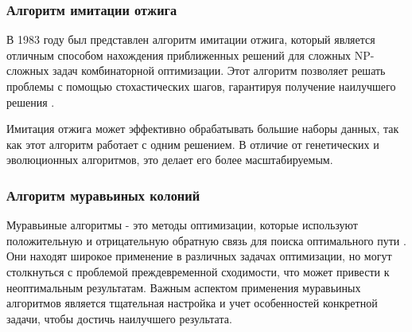 \subsubsection{Алгоритм имитации отжига}

В 1983 году был представлен алгоритм имитации отжига, который является отличным способом нахождения приближенных решений для сложных NP-сложных задач комбинаторной оптимизации. Этот алгоритм позволяет решать проблемы с помощью стохастических шагов, гарантируя получение наилучшего решения \cite{Kalashnikov_2004}.

Имитация отжига может эффективно обрабатывать большие наборы данных, так как этот алгоритм работает с одним решением. В отличие от генетических и эволюционных алгоритмов, это делает его более масштабируемым.

\subsubsection{Алгоритм муравьиных колоний}

Муравьиные алгоритмы - это методы оптимизации, которые используют положительную и отрицательную обратную связь для поиска оптимального пути \cite{Shtovba_2005}. Они находят широкое применение в различных задачах оптимизации, но могут столкнуться с проблемой преждевременной сходимости, что может привести к неоптимальным результатам. Важным аспектом применения муравьиных алгоритмов является тщательная настройка и учет особенностей конкретной задачи, чтобы достичь наилучшего результата.

